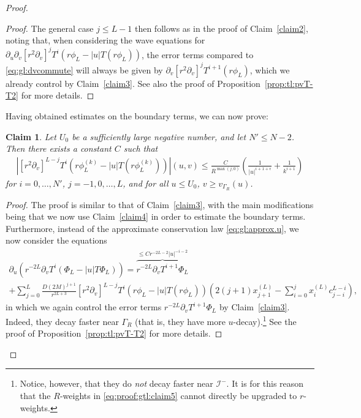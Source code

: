 \documentclass[11pt,english]{article}
\numberwithin{equation}{section}
\theoremstyle{remark}
\theoremstyle{plain}
\newtheorem{claim}{Claim}
\theoremstyle{remark}
\newcommand{\pu}{\partial_u}
\newcommand{\pv}{\partial_v}
\renewcommand{\(}{\left(}
\renewcommand{\)}{\right)}
\begin{document}
\begin{proof}
\begin{proof}
The general case $j\leq L-1$ then follows as in the proof of Claim~\ref{claim2}, noting that, when considering the wave equations for $\pu\pv[r^2\pv]^j T^i(r\phi_L-|u|T(r\phi_L))$, the error terms compared to \eqref{eq:gl:dvcommute} will always be given by $\pv[r^2\pv]^jT^{i+1}(r\phi_L)$, which we already control by Claim~\ref{claim3}.
 See also the proof of Proposition~\ref{prop:tl:pvT-T2} for more details. 
\end{proof}
Having obtained estimates on the boundary terms, we can now prove:	
	\begin{claim}\label{claim5}
	Let $U_0$ be a sufficiently large negative number, and let $N'\leq N-2$. Then there exists a constant $C$ such that 
	\begin{align}\label{eq:proof:gtl:claim5}
	\left|[r^2\pv]^{L-j}T^i(r\phi^{(k)}_L-|u|T(r\phi^{(k)}_L))\right|(u,v)\leq \frac{C}{R^{	\max(j,0)}}\left(\frac{1}{|u|^{i+1+\epsilon}}+\frac{1}{k^{i+1}}\right)
	\end{align} for $i=0,\dots,N'$, $j=-1,0, \dots, L$, and for all $u\leq U_0$, $v\geq v_{\Gamma_R}(u)$.
	\end{claim}
\begin{proof}
The proof is similar to that of Claim~\ref{claim3}, with the main modifications being that we now use Claim~\ref{claim4} in order to estimate the boundary terms. Furthermore, instead of the approximate conservation law \eqref{eq:gl:approx.u}, we now consider the equations
\begin{multline}
\pu(r^{-2L}\pv T^i(\Phi_L-|u|T \Phi_L))=\overbrace{r^{-2L}\pv T^{i+1}\Phi_L}^{\leq Cr^{-2L-2}|u|^{-i-2}}\\
+\sum_{j=0}^L\frac{D(2M)^{j+1}}{r^{2L+3}}[r^2\pv]^{L-j}T^i(r\phi_L-|u|T(r\phi_L)) \left(2(j+1)x^{(L)}_{j+1}-\sum_{i=0}^j x_i^{(L)} c_{j-i}^{L-i}\right) ,
\end{multline} in which we again control the error terms $r^{-2L}\pv T^{i+1}\Phi_L$ by Claim~\ref{claim3}. Indeed, they  decay faster near $\Gamma_R$ (that is, they have more $u$-decay).\footnote{Notice, however, that they do \emph{not} decay faster near $\mathcal{I}^-$. It is for this reason that the $R$-weights in \eqref{eq:proof:gtl:claim5} cannot directly be upgraded to $r$-weights.} See the proof of Proposition~\ref{prop:tl:pvT-T2} for more details.
\end{proof}


\end{proof}
\end{document}
